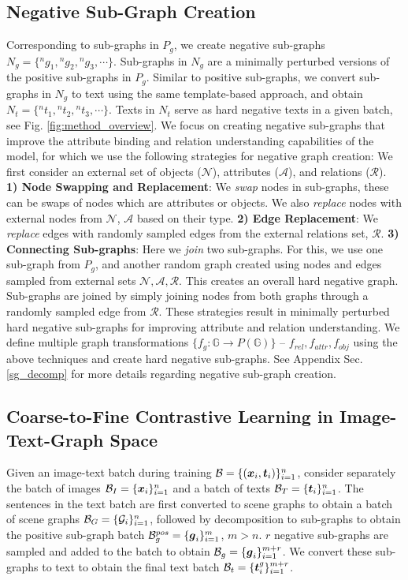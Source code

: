 \documentclass[11pt]{article}
\begin{document}
\subsection{Negative Sub-Graph Creation}
\label{subsec_neg_graph_creation}
Corresponding to sub-graphs in $P_g$, we create negative sub-graphs $N_g = \{{^{n}g_1}, {^{n}g_2}, {^{n}g_3}, \cdots \}$. Sub-graphs in $N_g$ are a minimally perturbed versions of the positive sub-graphs in $P_g$. Similar to positive sub-graphs, we convert sub-graphs in $N_g$ to text using the same template-based approach, and obtain $N_t = \{{^{n}t_1}, {^{n}t_2}, {^{n}t_3}, \cdots \}$. Texts in $N_t$ serve as hard negative texts in a given batch, see Fig. \ref{fig:method_overview}. We focus on creating negative sub-graphs that improve the attribute binding and relation understanding capabilities of the model, for which we use the following strategies for negative graph creation:
We first consider an external set of objects ($\mathcal{N}$), attributes ($\mathcal{A}$), and relations ($\mathcal{R}$). \\
\textbf{1) Node Swapping and Replacement}: We \textit{swap} nodes in sub-graphs, these can be swaps of nodes which are attributes or objects. We also \textit{replace} nodes with external nodes from $\mathcal{N}$, $\mathcal{A}$ based on their type. \textbf{2) Edge Replacement}: We \textit{replace} edges with randomly sampled edges from the external relations set, $\mathcal{R}$. \textbf{3) Connecting Sub-graphs}: Here we \textit{join} two sub-graphs. For this, we use one sub-graph from $P_g$, and another random graph created using nodes and edges sampled from external sets $\mathcal{N}, \mathcal{A}, \mathcal{R}$. This creates an overall hard negative graph. Sub-graphs are joined by simply joining nodes from both graphs through a randomly sampled edge from $\mathcal{R}$. 
These strategies result in minimally perturbed hard negative sub-graphs for improving attribute and relation understanding. We define multiple graph transformations $\{f_g: \mathbb{G} \longrightarrow P(\mathbb{G})\}$ -- $f_{rel}, f_{attr}, f_{obj}$ using the above techniques and create hard negative sub-graphs. See Appendix Sec. \ref{sg_decomp} for more details regarding negative sub-graph creation.


\subsection{Coarse-to-Fine Contrastive Learning in Image-Text-Graph Space}
\label{subsec_coarsetofine_loss}
Given an image-text batch during training $\mathcal{B} = \{(\boldsymbol{x}_i, \boldsymbol{t}_i)\}_{i=1}^{n}$, consider separately the batch of images $\mathcal{B}_I = \{\boldsymbol{x}_i\}_{i=1}^{n}$ and a batch of texts $\mathcal{B}_T = \{\boldsymbol{t}_i\}_{i=1}^{n}$.
The sentences in the text batch are first converted to scene graphs to obtain a batch of scene graphs $\mathcal{B}_G = \{\mathcal{G}_{i}\}_{i=1}^{n}$, followed by decomposition to sub-graphs to obtain the positive sub-graph batch $\mathcal{B}_g^{pos} = \{\boldsymbol{g}_{i}\}_{i=1}^{m}$, $m>n$. $r$ negative sub-graphs are sampled and added to the batch to obtain $\mathcal{B}_g = \{\boldsymbol{g}_{i}\}_{i=1}^{m+r}$.
We convert these sub-graphs to text to obtain the final text batch $\mathcal{B}_t = \{\boldsymbol{t}_{i}^{g}\}_{i=1}^{m+r}$.
\end{document}
